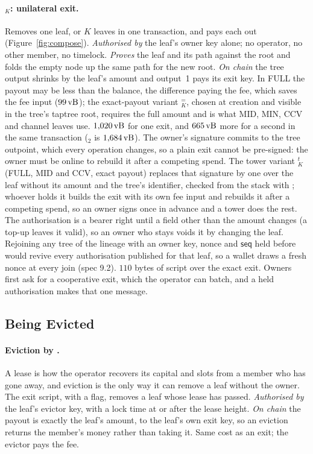 \paragraph{$_K$: unilateral exit.} Removes one leaf, or $K$
leaves in one transaction, and pays each out
(Figure~\ref{fig:compose}). \emph{Authorised by} the leaf's owner key alone;
no operator, no other member, no timelock. \emph{Proves} the leaf and its
path against the root and folds the empty node up the same path for the
new root. \emph{On chain} the tree output shrinks by the leaf's amount
and output~1 pays its exit key. In FULL the payout may be less than the
balance, the difference paying the fee, which saves the fee input
($99\,\mathrm{vB}$); the exact-payout variant $_K^{=}$, chosen at
creation and visible in the tree's taptree root, requires the full
amount and is what MID, MIN, CCV and channel leaves use. $1{,}020\,\mathrm{vB}$ for
one exit, and $665\,\mathrm{vB}$ more for a second in the same transaction
($_2$ is $1{,}684\,\mathrm{vB}$). The owner's signature commits to the
tree outpoint, which every operation changes, so a plain exit cannot be
pre-signed: the owner must be online to rebuild it after a competing
spend. The tower variant $_K^{t}$ (FULL, MID and CCV, exact
payout) replaces that signature by one over the leaf without its
amount and the tree's identifier, checked from the stack with
; whoever holds it builds the exit with its own fee
input and rebuilds it after a competing spend, so an owner signs once in
advance and a tower does the rest. The authorisation is a bearer right
until a field other than the amount changes (a top-up leaves it valid),
so an owner who stays voids it by changing the leaf. Rejoining any tree
of the lineage with an owner key, nonce and $\mathsf{seq}$ held before
would revive every authorisation published for that leaf, so a wallet
draws a fresh nonce at every join (spec 9.2). $110$ bytes of script over
the exact exit. Owners first ask for a cooperative exit, which the
operator can batch, and a held authorisation makes that one message.

\subsection{Being Evicted}

\paragraph{Eviction by .} A lease is how the operator recovers
its capital and slots from a member who has gone away, and eviction is
the only way it can remove a leaf without the owner. The exit script,
with a flag, removes a leaf whose lease has passed. \emph{Authorised by} the leaf's evictor
key, with a lock time at or after the lease height. \emph{On chain} the
payout is exactly the leaf's amount, to the leaf's own exit key, so an
eviction returns the member's money rather than taking it. Same cost as
an exit; the evictor pays the fee.

